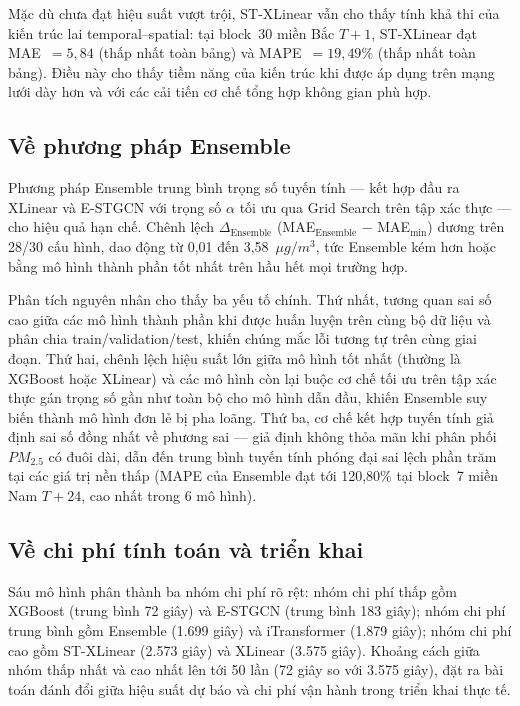 Mặc dù chưa đạt hiệu suất vượt trội, ST-XLinear vẫn cho thấy tính khả thi của kiến trúc lai temporal--spatial: tại block~30 miền Bắc $T{+}1$, ST-XLinear đạt MAE~$= 5{,}84$ (thấp nhất toàn bảng) và MAPE~$= 19{,}49\%$ (thấp nhất toàn bảng). Điều này cho thấy tiềm năng của kiến trúc khi được áp dụng trên mạng lưới dày hơn và với các cải tiến cơ chế tổng hợp không gian phù hợp.

\subsection{Về phương pháp Ensemble}

Phương pháp Ensemble trung bình trọng số tuyến tính --- kết hợp đầu ra XLinear và E-STGCN với trọng số $\alpha$ tối ưu qua Grid Search trên tập xác thực --- cho hiệu quả hạn chế. Chênh lệch $\Delta_{\text{Ensemble}}$ (MAE$_{\text{Ensemble}}$ $-$ MAE$_{\text{min}}$) dương trên 28/30 cấu hình, dao động từ 0,01 đến 3,58~$\mu g/m^3$, tức Ensemble kém hơn hoặc bằng mô hình thành phần tốt nhất trên hầu hết mọi trường hợp.

Phân tích nguyên nhân cho thấy ba yếu tố chính. Thứ nhất, tương quan sai số cao giữa các mô hình thành phần khi được huấn luyện trên cùng bộ dữ liệu và phân chia train/validation/test, khiến chúng mắc lỗi tương tự trên cùng giai đoạn. Thứ hai, chênh lệch hiệu suất lớn giữa mô hình tốt nhất (thường là XGBoost hoặc XLinear) và các mô hình còn lại buộc cơ chế tối ưu trên tập xác thực gán trọng số gần như toàn bộ cho mô hình dẫn đầu, khiến Ensemble suy biến thành mô hình đơn lẻ bị pha loãng. Thứ ba, cơ chế kết hợp tuyến tính giả định sai số đồng nhất về phương sai --- giả định không thỏa mãn khi phân phối $PM_{2.5}$ có đuôi dài, dẫn đến trung bình tuyến tính phóng đại sai lệch phần trăm tại các giá trị nền thấp (MAPE của Ensemble đạt tới 120,80\% tại block~7 miền Nam $T{+}24$, cao nhất trong 6 mô hình).

\subsection{Về chi phí tính toán và triển khai}

Sáu mô hình phân thành ba nhóm chi phí rõ rệt: nhóm chi phí thấp gồm XGBoost (trung bình 72 giây) và E-STGCN (trung bình 183 giây); nhóm chi phí trung bình gồm Ensemble (1.699 giây) và iTransformer (1.879 giây); nhóm chi phí cao gồm ST-XLinear (2.573 giây) và XLinear (3.575 giây). Khoảng cách giữa nhóm thấp nhất và cao nhất lên tới 50 lần (72 giây so với 3.575 giây), đặt ra bài toán đánh đổi giữa hiệu suất dự báo và chi phí vận hành trong triển khai thực tế.


